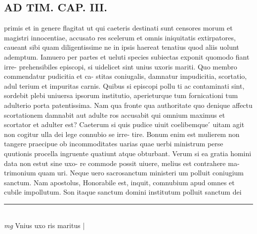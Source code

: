 \documentclass{article}
\begin{document}
\begin{pages}
\section*{AD TIM. CAP. III. }
\marginpar{[ p.124 ]}\pstart primis et in genere flagitat ut qui caeteris destinati sunt censores morum et magistri innocentiae, accusato res scelerum et omnis iniquitatis extirpatores, caueant sibi quam diligentissime ne in ipsis haereat tenatius quod aliis uolunt ademptum. Iamuero per partes et ueluti species subiectas exponit quomodo fiant irre- prehensibiles episcopi, si uidelicet sint unius uxoris mariti. Quo membro commendatur pudicitia et ca- stitas coniugalis, damnatur impudicitia, scortatio, adul terium et impuritas carnis. Quibus si episcopi pollu ti ac contaminati sint, sordebit plebi uniuersa ipsorum institutio, aperieturque tum fornicationi tum adulterio porta patentissima. Nam qua fronte qua authoritate quo denique affectu scortationem damnabit aut adulte ros accusabit qui omnium maximus et scortator et adulter est? Caeterum si quis pudice uiuit coelibemque ́ uitam agit non cogitur ulla dei lege connubio se irre- tire. Bonum enim est mulierem non tangere praecipue ob incommoditates uarias quae uerbi ministrum perse quutionis procella ingruente quatiunt atque obturbant. Verum si ea gratia homini data non estut sine uxo- re commode possit uiuere, melius est contrahere ma- trimonium quam uri. Neque uero sacrosanctum ministeri um polluit coniugium sanctum. Nam apostolus, Honorabile est, inquit, comnubium apud omnes et cubile impollutum. Son itaque sanctum domini institutum polluit sanctum dei  \pend
\vspace{0.5cm}\noindent
\vspace{0.2cm}\rule{1cm}{0.2pt}\\ 
\hspace{0.2cm}\textit{mg}
\footnotesize Vnius uxo ris maritus 
\normalsize| 

\end{pages}
\end{document}
